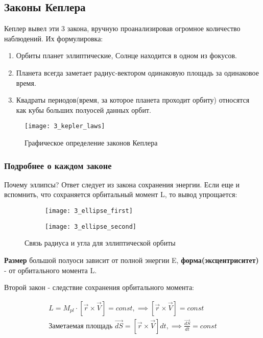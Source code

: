 \subsection{Законы Кеплера}

Кеплер вывел эти 3 закона, вручную проанализировав огромное количество наблюдений. Их формулировка:


\begin{enumerate}
	\item Орбиты планет эллиптические, Солнце находится в одном из фокусов.
	\item Планета всегда заметает радиус-вектором одинаковую площадь за одинаковое время.
	\item Квадраты периодов(время, за которое планета проходит орбиту) относятся как кубы больших полуосей данных орбит.
\end{enumerate}

\begin{figure}[H]
	\centering
	\texttt{[image: 3\_kepler\_laws]}
	\caption{Графическое определение законов Кеплера}
	\label{fig:3_kepler_laws}
\end{figure}

\subsubsection{Подробнее о каждом законе}

Почему эллипсы? Ответ следует из закона сохранения энергии. Если еще и вспомнить, что сохраняется орбитальный момент L, то вывод упрощается:

\begin{figure}[H]
	\begin{subfigure}
		\centering
		\texttt{[image: 3\_ellipse\_first]}
	\end{subfigure}
	
	\begin{subfigure}
		\centering
		\texttt{[image: 3\_ellipse\_second]}
	\end{subfigure}
	
	\caption{Связь радиуса и угла для эллиптической орбиты}
	\label{fig:3_ellipse}
\end{figure}

\textbf{Размер} большой полуоси зависит от полной энергии E, \textbf{форма(эксцентриситет)} - от орбитального момента L.

Второй закон - следствие сохранения орбитального момента:

\begin{eqnarray}
L = M_{pl} \cdot [\vec{r} \times \vec{V}] = const, \implies [\vec{r} \times \vec{V}] = const 
\label{eq:3_orb_moment}
\\
\text{Заметаемая площадь } \vec{dS} = [\vec{r} \times \vec{V}] dt, \implies \frac{\vec{dS}}{dt} = const
\label{eq:3_kepler_area}
\end{eqnarray}

